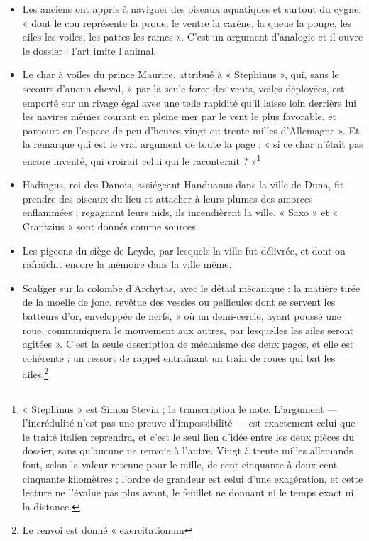 \documentclass[11pt,a4paper]{article}
\begin{document}
\begin{itemize}
  \item Les anciens ont appris à naviguer des oiseaux aquatiques et surtout du
    cygne, « dont le cou représente la proue, le ventre la carène, la queue la
    poupe, les ailes les voiles, les pattes les rames ». C'est un argument
    d'analogie et il ouvre le dossier : l'art imite l'animal.
  \item Le char à voiles du prince Maurice, attribué à « Stephinus », qui, sans
    le secours d'aucun cheval, « par la seule force des vents, voiles déployées,
    est emporté sur un rivage égal avec une telle rapidité qu'il laisse loin
    derrière lui les navires mêmes courant en pleine mer par le vent le plus
    favorable, et parcourt en l'espace de peu d'heures vingt ou trente milles
    d'Allemagne ». Et la remarque qui est le vrai argument de toute la page :
    « si ce char n'était pas encore inventé, qui croirait celui qui le
    raconterait ? »\footnote{« Stephinus » est Simon Stevin ; la transcription le
    note. L'argument — l'incrédulité n'est pas une preuve d'impossibilité — est
    exactement celui que le traité italien reprendra, et c'est le seul lien
    d'idée entre les deux pièces du dossier, sans qu'aucune ne renvoie à
    l'autre. Vingt à trente milles allemands font, selon la valeur retenue pour
    le mille, de cent cinquante à deux cent cinquante kilomètres ; l'ordre de
    grandeur est celui d'une exagération, et cette lecture ne l'évalue pas plus
    avant, le feuillet ne donnant ni le temps exact ni la distance.}
  \item Hadingus, roi des Danois, assiégeant Handuanus dans la ville de Duna,
    fit prendre des oiseaux du lieu et attacher à leurs plumes des amorces
    enflammées ; regagnant leurs nids, ils incendièrent la ville. « Saxo » et
    « Crantzius » sont donnés comme sources.
  \item Les pigeons du siège de Leyde, par lesquels la ville fut délivrée, et
    dont on rafraîchit encore la mémoire dans la ville même.
  \item Scaliger sur la colombe d'Archytas, avec le détail mécanique : la
    matière tirée de la moelle de jonc, revêtue des vessies ou pellicules dont
    se servent les batteurs d'or, enveloppée de nerfs, « où un demi-cercle, ayant
    poussé une roue, communiquera le mouvement aux autres, par lesquelles les
    ailes seront agitées ». C'est la seule description de mécanisme des deux
    pages, et elle est cohérente : un ressort de rappel entraînant un train de
    roues qui bat les ailes.\footnote{Le renvoi est donné « exercitationum
}
\end{itemize}
\end{document}
